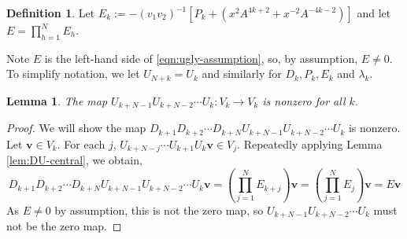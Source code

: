 \documentclass{article}
\renewcommand{\v}{\mathbf{v}}
\newtheorem{lemma}[theorem]{Lemma}
\theoremstyle{definition}
\newtheorem{definition}[theorem]{Definition}
\begin{document}
\begin{definition}
	Let $E_k:=-(v_1v_2)^{-1}[P_k+(x^2A^{4k+2}+x^{-2}A^{-4k-2})]$ and let $E=\prod_{h=1}^N E_h$. \end{definition}

Note $E$ is the left-hand side of \eqref{eqn:ugly-assumption}, so, by assumption, $E\neq 0$. To simplify notation, we let $U_{N+k}=U_k$ and similarly for $D_k, P_k, E_k$ and $\lambda_k$.

\begin{lemma}\label{lem:UD-nonzero}
The map $U_{k+N-1}U_{k+N-2}\cdots U_{k}:V_k\to V_k$ is nonzero for all $k$.
\end{lemma}
\begin{proof}
    We will show the map $D_{k+1}D_{k+2}\cdots D_{k+N}U_{k+N-1}U_{k+N-2}\cdots U_{k}$ is nonzero. Let $\v\in V_k$. For each $j$, $U_{k+N-j}\cdots U_{k+1}U_{k}\v\in V_j$. Repeatedly applying Lemma \ref{lem:DU-central}, we obtain,
\[
D_{k+1}D_{k+2}\cdots D_{k+N}U_{k+N-1}U_{k+N-2}\cdots U_{k}\v=\left(\prod_{j=1}^N E_{k+j}\right)\v=\left(\prod_{j=1}^N E_{j}\right)\v=E\v
\]
As $E\neq 0$ by assumption, this is not the zero map, so $U_{k+N-1}U_{k+N-2}\cdots U_{k}$ must not be the zero map.
\end{proof}
\end{document}
